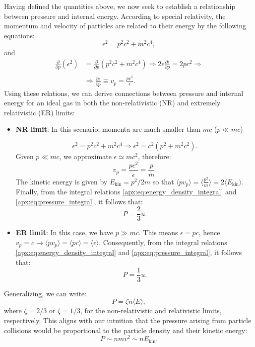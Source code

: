 \documentclass[main.tex]{subfiles}
\begin{document}
Having defined the quantities above, we now seek to establish a relationship between pressure and internal energy. According to special relativity, the momentum and velocity of particles are related to their energy by the following equations:
\begin{equation}
    \epsilon^2 = p^2 c^2 + m^2 c^4,
\end{equation}
and
\begin{align}
    \nonumber \frac{\partial}{\partial p} (\epsilon^2) &= \frac{\partial}{\partial p} (p^2 c^2 + m^2 c^4) \Rightarrow 2\epsilon \frac{\partial \epsilon}{\partial p} = 2p c^2 \Rightarrow \\\nonumber\\
    &\Rightarrow \frac{\partial \epsilon}{\partial p} \equiv v_p = \frac{pc^2}{\epsilon}.
\end{align}
Using these relations, we can derive connections between pressure and internal energy for an ideal gas in both the non-relativistic (NR) and extremely relativistic (ER) limits:
\begin{itemize}
    \item \textbf{NR limit}: In this scenario, momenta are much smaller than $mc$ ($p \ll mc$)

    $$\epsilon^2 = p^2 c^2 + m^2 c^4 \Rightarrow \epsilon^2 = c^2 \left(p^2 + m^2c^2 \right).$$
    Given $p \ll mc$, we approximate $\epsilon \simeq mc^2$, therefore:
    $$v_p = \frac{pc^2}{\epsilon} = \frac{p}{m}.$$
    The kinetic energy is given by $E_{\text{kin}} = p^2/2m$ so that $\langle p v_p \rangle = \langle \frac{p^2}{m} \rangle = 2 \langle E_{\text{kin}} \rangle $.
    Finally, from the integral relations \eqref{apx:eq:energy_density_integral} and \eqref{apx:eq:pressure_integral}, it follows that:
    \begin{equation}
        \label{apx:eq:pressure_internal_energy_relation_for_nr_case}
        P = \frac{2}{3}u.
    \end{equation}


    \item \textbf{ER limit}: In this case, we have $p \gg mc$. This means $\epsilon = pc$, hence $v_p = c \longrightarrow \langle p v_p \rangle = \langle pc \rangle = \langle \epsilon \rangle$.
    Consequently, from the integral relations \eqref{apx:eq:energy_density_integral} and \eqref{apx:eq:pressure_integral}, it follows that:
    \begin{equation}
        \label{apx:eq:pressure_internal_energy_relation_for_er_case}
        P = \frac{1}{3}u.
    \end{equation}
\end{itemize}
Generalizing, we can write:
\begin{equation}\label{apx:eq:second_generalized_eos}
    P = \zeta n \langle E \rangle,
\end{equation}
where $\zeta = 2/3$ or $\zeta = 1/3$, for the non-relativistic and relativistic limits, respectively. This aligns with our intuition that the pressure arising from particle collisions would be proportional to the particle density and their kinetic energy:
\begin{equation*}
    P \sim n mv^2 \sim n E_{\text{kin}}.
\end{equation*}
\end{document}
